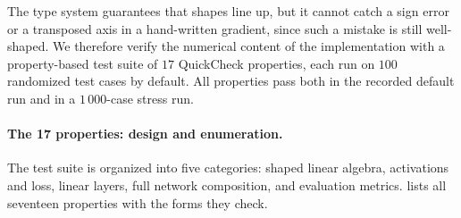 \documentclass[sigconf,nonacm]{acmart}
\begin{document}
The type system guarantees that shapes line up, but it cannot catch a
sign error or a transposed axis in a hand-written gradient, since such a mistake
is still well-shaped. We therefore verify the numerical content of the
implementation with a property-based test suite of $17$ QuickCheck properties,
each run on $100$ randomized test cases by default. All properties pass both in
the recorded default run and in a $1\,000$-case stress run.

\paragraph{The 17 properties: design and enumeration.}
The test suite is organized into five categories: shaped linear algebra, activations
and loss, linear layers, full network composition, and evaluation metrics.
 lists all seventeen properties with the forms they check.
\end{document}
